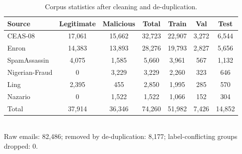 \begin{table}[t]
\centering
\caption{Corpus statistics after cleaning and de-duplication.}
\label{tab:dataset}
\footnotesize
\begin{tabular}{lcccccc}
\toprule
\textbf{Source} & \textbf{Legitimate} & \textbf{Malicious} & \textbf{Total} & \textbf{Train} & \textbf{Val} & \textbf{Test} \\
\midrule
CEAS-08 & 17,061 & 15,662 & 32,723 & 22,907 & 3,272 & 6,544 \\
Enron & 14,383 & 13,893 & 28,276 & 19,793 & 2,827 & 5,656 \\
SpamAssassin & 4,075 & 1,585 & 5,660 & 3,961 & 567 & 1,132 \\
Nigerian-Fraud & 0 & 3,229 & 3,229 & 2,260 & 323 & 646 \\
Ling & 2,395 & 455 & 2,850 & 1,995 & 285 & 570 \\
Nazario & 0 & 1,522 & 1,522 & 1,066 & 152 & 304 \\
Total & 37,914 & 36,346 & 74,260 & 51,982 & 7,426 & 14,852 \\
\bottomrule
\end{tabular}
\\[2pt]{\scriptsize Raw emails: 82,486; removed by de-duplication: 8,177; label-conflicting groups dropped: 0.}
\end{table}